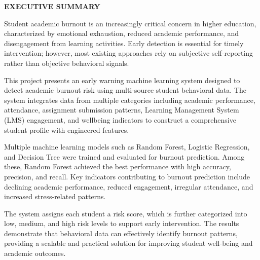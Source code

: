\begin{center}
	\Large{\textbf{EXECUTIVE SUMMARY}}	
\end{center}

\vspace{1em}

\normalsize

Student academic burnout is an increasingly critical concern in higher education, characterized by emotional exhaustion, reduced academic performance, and disengagement from learning activities. Early detection is essential for timely intervention; however, most existing approaches rely on subjective self-reporting rather than objective behavioral signals.

This project presents an early warning machine learning system designed to detect academic burnout risk using multi-source student behavioral data. The system integrates data from multiple categories including academic performance, attendance, assignment submission patterns, Learning Management System (LMS) engagement, and wellbeing indicators to construct a comprehensive student profile with engineered features.

Multiple machine learning models such as Random Forest, Logistic Regression, and Decision Tree were trained and evaluated for burnout prediction. Among these, Random Forest achieved the best performance with high accuracy, precision, and recall. Key indicators contributing to burnout prediction include declining academic performance, reduced engagement, irregular attendance, and increased stress-related patterns.

The system assigns each student a risk score, which is further categorized into low, medium, and high risk levels to support early intervention. The results demonstrate that behavioral data can effectively identify burnout patterns, providing a scalable and practical solution for improving student well-being and academic outcomes.